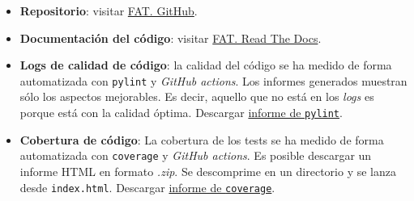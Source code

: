 \begin{itemize}
\item
  \textbf{Repositorio}: visitar \href{https://github.com/rmt0009alu/FAT}{FAT. GitHub}.
\item
  \textbf{Documentación del código}: visitar \href{https://fat.readthedocs.io/es/latest/intro.html#}{FAT. Read The Docs}. 
\item 
  \textbf{Logs de calidad de código}: la calidad del código se ha medido de forma automatizada con \texttt{pylint} y \emph{GitHub actions}. Los informes generados muestran sólo los aspectos mejorables. Es decir, aquello que no está en los \emph{logs} es porque está con la calidad óptima. Descargar \href{https://github.com/rmt0009alu/FAT/blob/main/informes\%20GitHub\%20actions/logs_de_pylint.zip}{informe de \texttt{pylint}}.
\item
  \textbf{Cobertura de código}: La cobertura de los tests se ha medido de forma automatizada con \texttt{coverage} y \emph{GitHub actions}. Es posible descargar un informe HTML en formato \emph{.zip}. Se descomprime en un directorio y se lanza desde \texttt{index.html}. Descargar \href{https://github.com/rmt0009alu/FAT/blob/main/informes\%20GitHub\%20actions/informe_de_coverage.zip}{informe de \texttt{coverage}}.

\end{itemize}


